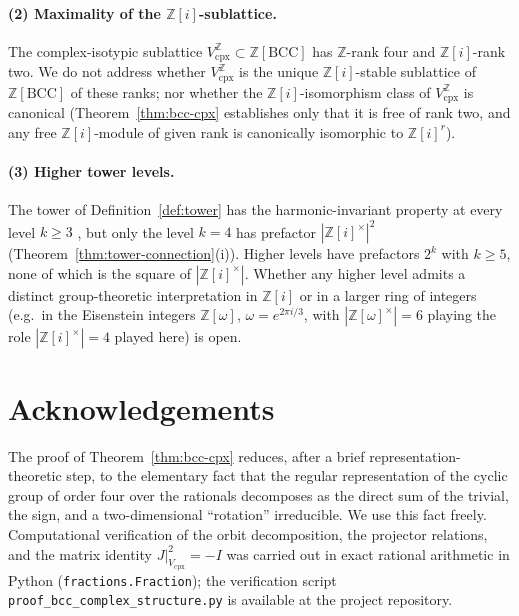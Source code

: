 \documentclass[11pt,reqno]{amsart}
\theoremstyle{plain}
\theoremstyle{definition}
\theoremstyle{remark}
\numberwithin{equation}{section}
\newcommand{\BCC}{\mathrm{BCC}}
\newcommand{\Vcpx}{V_{\mathrm{cpx}}}
\begin{document}
\paragraph{(2) Maximality of the $\mathbb{Z}[i]$-sublattice.}
The complex-isotypic sublattice
$\Vcpx^{\mathbb{Z}} \subset \mathbb{Z}[\BCC]$ has $\mathbb{Z}$-rank
four and $\mathbb{Z}[i]$-rank two. We do not address whether
$\Vcpx^{\mathbb{Z}}$ is the unique $\mathbb{Z}[i]$-stable sublattice
of $\mathbb{Z}[\BCC]$ of these ranks; nor whether the
$\mathbb{Z}[i]$-isomorphism class of $\Vcpx^{\mathbb{Z}}$ is
canonical (Theorem~\ref{thm:bcc-cpx} establishes only that it is
free of rank two, and any free $\mathbb{Z}[i]$-module of given rank
is canonically isomorphic to $\mathbb{Z}[i]^{r}$).

\paragraph{(3) Higher tower levels.}
The tower of Definition~\ref{def:tower} has the harmonic-invariant
property at every level $k \geq 3$ \cite[Theorem 3.1]{paper-a}, but
only the level $k = 4$ has prefactor $|\mathbb{Z}[i]^{\times}|^{2}$
(Theorem~\ref{thm:tower-connection}(i)). Higher levels have
prefactors $2^{k}$ with $k \geq 5$, none of which is the square of
$|\mathbb{Z}[i]^{\times}|$. Whether any higher level admits a
distinct group-theoretic interpretation in $\mathbb{Z}[i]$ or in a
larger ring of integers (e.g.\ in the Eisenstein integers
$\mathbb{Z}[\omega]$, $\omega = e^{2\pi i / 3}$, with $|\mathbb{Z}
[\omega]^{\times}| = 6$ playing the role $|\mathbb{Z}[i]^{\times}|
= 4$ played here) is open.

\section*{Acknowledgements}

The proof of Theorem~\ref{thm:bcc-cpx} reduces, after a brief
representation-theoretic step, to the elementary fact that the
regular representation of the cyclic group of order four over the
rationals decomposes as the direct sum of the trivial, the sign,
and a two-dimensional ``rotation'' irreducible. We use this fact
freely. Computational verification of the orbit decomposition, the
projector relations, and the matrix identity
$J|_{\Vcpx}^{2} = -I$ was carried out in exact rational arithmetic
in Python (\texttt{fractions.Fraction}); the verification script
\texttt{proof\_bcc\_complex\_structure.py} is available at the
project repository.
\end{document}
